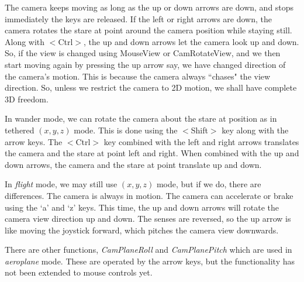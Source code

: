 \documentclass[12pt]{article}
\begin{document}
The camera keeps moving as long as the up or down arrows are
down, and stops immediately the keys are released.
If the left or right arrows are down, the camera rotates the stare
at point around the camera position  while staying still. Along with $<$Ctrl$>$, the up
and down arrows let the camera look up and down. So,
if the view is changed using MouseView or CamRotateView, and we then
start moving again by pressing the up arrow say, we have changed direction
of the camera's motion. This is because
the camera always ``chases" the view direction. So, unless we restrict the camera
to 2D motion, we shall have complete 3D freedom.

In wander mode, we can rotate the camera about the stare at position
as in tethered $(x,y,z)$ mode. This is done using the $<$Shift$>$ key
along with the arrow keys. The $<$Ctrl$>$ key combined with the left
and right arrows translates the camera and the stare at point  left and right.
When combined with the up and down arrows, the camera and the stare at point 
translate up and down.

In {\it flight} mode, we may still use $(x,y,z)$ mode, but if we do,
there are differences. The camera is always in motion. The camera
can accelerate or brake using the `a' and `z' keys. This time,
the up and down arrows will rotate the camera view direction up
and down. The senses are reversed, so the up arrow is like moving the
joystick forward, which pitches the camera view downwards.

There are other functions, {\it CamPlaneRoll} and {\it CamPlanePitch}
which are used in  {\it aeroplane} mode. These are operated by the arrow
keys, but the functionality has not been extended to mouse controls yet.
\end{document}
